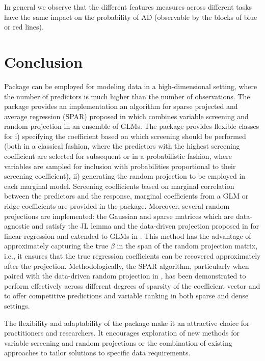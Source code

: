 \documentclass[
  article,
  nojss]{jss}
\begin{document}
In general we observe that the different features measures across
different tasks have the same impact on the probability of AD
(observable by the blocks of blue or red lines).

\section{Conclusion}\label{sec-conclusion}

Package  can be employed for modeling data in a
high-dimensional setting, where the number of predictors is much higher
than the number of observations. The package provides an implementation
an algorithm for sparse projected and average regression (SPAR) proposed
in \citet{parzer2024glms} which combines variable screening and random
projection in an ensemble of GLMs. The package provides flexible classes
for i) specifying the coefficient based on which screening should be
performed (both in a classical fashion, where the predictors with the
highest screening coefficient are selected for subsequent or in a
probabilistic fashion, where variables are sampled for inclusion with
probabilities proportional to their screening coefficient), ii)
generating the random projection to be employed in each marginal model.
Screening coefficients based on marginal correlation between the
predictors and the response, marginal coefficients from a GLM or ridge
coefficients are provided in the package. Moreover, several random
projections are implemented: the Gaussian and sparse matrices which are
data-agnostic and satisfy the JL lemma and the data-driven projection
proposed in \citet{parzer2024sparse} for linear regression and extended
to GLMs in \citet{parzer2024glms}. This method has the advantage of
approximately capturing the true \(\beta\) in the span of the random
projection matrix, i.e., it ensures that the true regression
coefficients can be recovered approximately after the projection.
Methodologically, the SPAR algorithm, particularly when paired with the
data-driven random projection in \citet{parzer2024glms}, has been
demonstrated to perform effectively across different degrees of sparsity
of the coefficient vector and to offer competitive predictions and
variable ranking in both sparse and dense settings.

The flexibility and adaptability of the  package make it an
attractive choice for practitioners and researchers. It encourages
exploration of new methods for variable screening and random projections
or the combination of existing approaches to tailor solutions to
specific data requirements.
\end{document}
